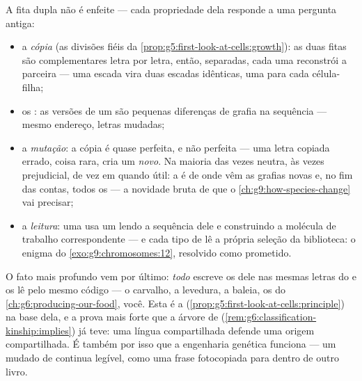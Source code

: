 \begin{proposition}\label{prop:g9:genes-and-dna:explains}
A fita dupla não é enfeite --- cada propriedade dela responde
a uma pergunta antiga:
\begin{itemize}
  \item a \emph{cópia} (as divisões fiéis da
        \cref{prop:g5:first-look-at-cells:growth}): as duas
        fitas são complementares letra por letra, então,
        separadas, cada uma reconstrói a parceira --- uma
        escada vira duas escadas idênticas, uma para cada
        célula-filha;
  \item os \emph{}: as versões de um  são pequenas
        diferenças de grafia na sequência --- mesmo
        endereço, letras mudadas;
  \item a \emph{mutação}: a cópia é quase
        perfeita, e não perfeita --- uma letra copiada
        errado, coisa rara, cria um  \emph{novo}. Na
        maioria das vezes neutra, às vezes prejudicial, de
        vez em quando útil: a  é de onde vêm as
        grafias novas e, no fim das contas, todos os 
        --- a novidade bruta de que o
        \cref{ch:g9:how-species-change} vai precisar;
  \item a \emph{leitura}: uma  usa um  lendo a
        sequência dele e construindo a molécula de trabalho
        correspondente --- e cada tipo de  lê a
        própria seleção da biblioteca: o enigma do
        \cref{exo:g9:chromosomes:12}, resolvido como
        prometido.
\end{itemize}
\end{proposition}
\admitted

\begin{remark}\label{rem:g9:genes-and-dna:universal}
O fato mais profundo vem por último: \emph{todo} 
escreve os  dele nas mesmas letras do  e os lê pelo
mesmo código --- o carvalho, a levedura, a baleia, os
 do \cref{ch:g6:producing-our-food}, você. Esta é a
(\cref{prop:g5:first-look-at-cells:principle}) na base dela,
e a prova mais forte que a árvore de 
(\cref{rem:g6:classification-kinship:implies}) já teve: uma
língua compartilhada defende uma origem compartilhada. É
também por isso que a engenharia genética funciona --- um
 mudado de  continua legível, como uma frase
fotocopiada para dentro de outro livro.
\end{remark}

